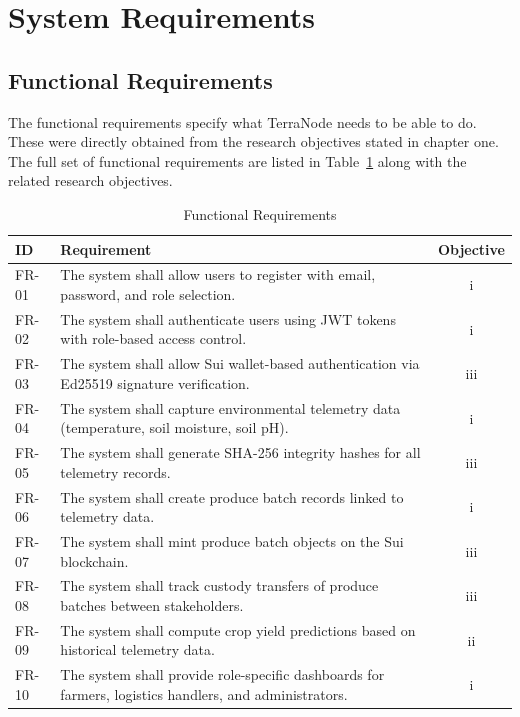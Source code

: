 \section{System Requirements}

\subsection{Functional Requirements}

The functional requirements specify what TerraNode needs to be able to do. These were directly obtained from the research objectives stated in chapter one. The full set of functional requirements are listed in Table~\ref{tab:functional_req} along with the related research objectives.

\begin{table}[H]
\centering
\small
\singlespacing
\renewcommand{\arraystretch}{1.15}
\caption{Functional Requirements}
\label{tab:functional_req}
\begin{tabularx}{\textwidth}{|l|>{\raggedright\arraybackslash}X|c|}
\hline
\textbf{ID} & \textbf{Requirement} & \textbf{Objective} \\
\hline
FR-01 & The system shall allow users to register with email, password, and role selection. & i \\
\hline
FR-02 & The system shall authenticate users using JWT tokens with role-based access control. & i \\
\hline
FR-03 & The system shall allow Sui wallet-based authentication via Ed25519 signature verification. & iii \\
\hline
FR-04 & The system shall capture environmental telemetry data (temperature, soil moisture, soil pH). & i \\
\hline
FR-05 & The system shall generate SHA-256 integrity hashes for all telemetry records. & iii \\
\hline
FR-06 & The system shall create produce batch records linked to telemetry data. & i \\
\hline
FR-07 & The system shall mint produce batch objects on the Sui blockchain. & iii \\
\hline
FR-08 & The system shall track custody transfers of produce batches between stakeholders. & iii \\
\hline
FR-09 & The system shall compute crop yield predictions based on historical telemetry data. & ii \\
\hline
FR-10 & The system shall provide role-specific dashboards for farmers, logistics handlers, and administrators. & i \\
\hline
\end{tabularx}
\end{table}

